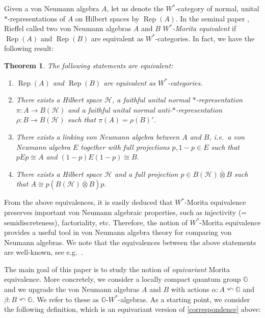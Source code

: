 \documentclass[reqno]{amsart}
\numberwithin{equation}{section}
\newtheorem{Theorem}{Theorem}[section]
\DeclareMathOperator{\Rep}{\mathrm{Rep}}
\newcommand{\G}{\mathbb{G}}
\newcommand{\ovot}{\bar{\otimes}}
\begin{document}
Given a von Neumann algebra $A$, let us denote the $W^*$-category of normal, unital $*$-representations of $A$ on Hilbert spaces by $\Rep(A)$. In the seminal paper \cite{Rie74}, Rieffel called two von Neumann algebras $A$ and $B$ \emph{$W^*$-Morita equivalent} if $\Rep(A)$ and $\Rep(B)$ are equivalent as $W^*$-categories. In fact, we have the following result:
\begin{Theorem}\label{Morita characterizations} The following statements are equivalent:
    \begin{enumerate}\setlength\itemsep{-0.5em}
    \item\label{category} $\Rep(A)$ and $\Rep(B)$ are equivalent as $W^*$-categories.
    \item\label{correspondence} There exists a Hilbert space $\mathcal{H}$, a faithful unital normal $*$-representation $\pi: A\to B(\mathcal{H})$ and a faithful unital normal anti-$*$-representation $\rho: B \to B(\mathcal{H})$ such that $\pi(A) = \rho(B)'$.
    \item\label{linking} There exists a linking von Neumann algebra between $A$ and $B$, i.e.\ a von Neumann algebra $E$ together with full projections $p, 1-p\in E$ such that $pEp\cong A$ and $(1-p)E(1-p)\cong B$.
    \item\label{corner} There exists a Hilbert space $\mathcal{H}$ and a full projection $p\in B(\mathcal{H})\ovot B$ such that $A \cong p(B(\mathcal{H})\ovot B)p.$
\end{enumerate}
\end{Theorem}

From the above equivalences, it is easily deduced that $W^*$-Morita equivalence preserves important von Neumann algebraic properties, such as injectivity (= semidiscreteness), factoriality, etc. Therefore, the notion of $W^*$-Morita equivalence provides a useful tool in von Neumann algebra theory for comparing von Neumann algebras. We note that the equivalences between the above statements are well-known, see e.g.\ \cites{Rie74, BDH88, Bro03,DC09}.

The main goal of this paper is to study the notion of \emph{equivariant} Morita equivalence. More concretely, we consider a locally compact quantum group $\G$ and we upgrade the von Neumann algebras $A$ and $B$ with actions $\alpha: A\curvearrowleft \G$ and $\beta: B\curvearrowleft \G$. We refer to these as $\G$-$W^*$-algebras. As a starting point, we consider the following definition, which is an equivariant version of \eqref{correspondence} above:
\end{document}
